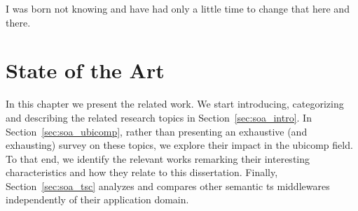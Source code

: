 
\begin{savequote}[50mm]
I was born not knowing and have had only a little time to change that here and there.
\end{savequote}


\chapter{State of the Art}
\label{cha:stateoftheart}
\newcommand{\pathchaptwo}{2_state_of_the_art}

\ifpdf
    \graphicspath{{\pathchaptwo/figures/PNG/}{\pathchaptwo/figures/PDF/}{\pathchaptwo/figures/}}
\else
    \graphicspath{{\pathchaptwo/figures/EPS/}{\pathchaptwo/figures/}}
\fi



In this chapter we present the related work.
We start introducing, categorizing and describing the related research topics in Section~\ref{sec:soa_intro}. %
In Section~\ref{sec:soa_ubicomp}, rather than presenting an exhaustive (and exhausting) survey on these topics, we explore their impact in the \ac{ubicomp} field. %
To that end, we identify the relevant works remarking their interesting characteristics and how they relate to this dissertation.
Finally, Section~\ref{sec:soa_tsc} analyzes and compares other semantic \ac{ts} middlewares independently of their application domain.













